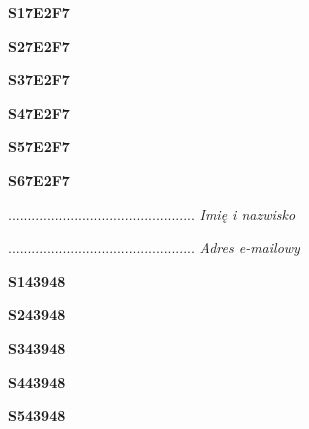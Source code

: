 \begin{turn}{90}\huge \textbf{S17E2F7}\end{turn}

\begin{turn}{90}\huge \textbf{S27E2F7}\end{turn}

\begin{turn}{90}\huge \textbf{S37E2F7}\end{turn}

\begin{turn}{90}\huge \textbf{S47E2F7}\end{turn}

\begin{turn}{90}\huge \textbf{S57E2F7}\end{turn}

\begin{turn}{90}\huge \textbf{S67E2F7}\end{turn}

\begin{turn}{90}\begin{minipage}{\linewidth} \vspace{20mm} ................................................  \textit{Imię i nazwisko}\end{minipage}\end{turn}

\begin{turn}{90}\begin{minipage}{\linewidth} \vspace{20mm} ................................................  \textit{Adres e-mailowy}\end{minipage}\end{turn}

\begin{turn}{90}\huge \textbf{S143948}\end{turn}

\begin{turn}{90}\huge \textbf{S243948}\end{turn}

\begin{turn}{90}\huge \textbf{S343948}\end{turn}

\begin{turn}{90}\huge \textbf{S443948}\end{turn}

\begin{turn}{90}\huge \textbf{S543948}\end{turn}

